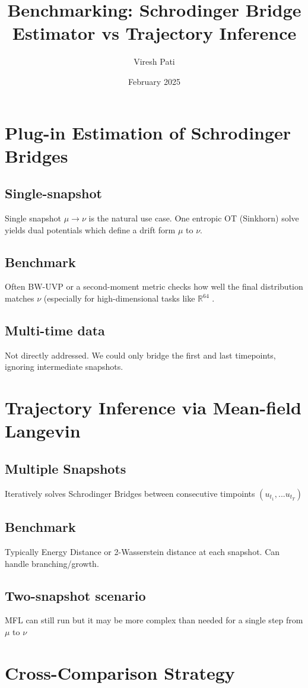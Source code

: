 \documentclass{article}
\title{Benchmarking: Schrodinger Bridge Estimator vs Trajectory Inference
}
\author{Viresh Pati}
\date{February 2025}
\begin{document}
\maketitle

\section{Plug-in Estimation of Schrodinger Bridges}
\subsection{Single-snapshot}
Single snapshot $\mu \rightarrow \nu$ is the natural use case. One entropic OT (Sinkhorn) solve yields dual potentials which define a drift form $\mu $ to $\nu$.
\subsection{Benchmark} 
Often BW-UVP or a second-moment metric checks how well the final distribution matches $\nu$ (especially for high-dimensional tasks like $\mathbb{R}^{64}$ .
\subsection{Multi-time data}
Not directly addressed. We could only bridge the first and last timepoints, ignoring intermediate snapshots.
\section{Trajectory Inference via Mean-field Langevin}
\subsection{Multiple Snapshots}
Iteratively solves Schrodinger Bridges between consecutive timpoints $(u_{t_1},...u_{t_{T}})$
\subsection{Benchmark}
Typically Energy Distance or 2-Wasserstein distance at each snapshot. Can handle branching/growth.
\subsection{Two-snapshot scenario}
MFL can still run but it may be more complex than needed for a single step from $\mu$ to $\nu$ 
\section{Cross-Comparison Strategy}
\end{document}
